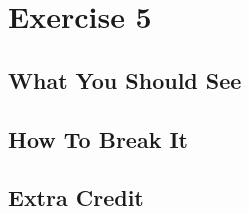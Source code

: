 \chapter{Exercise 5}


\section{What You Should See}


\section{How To Break It}


\section{Extra Credit}



